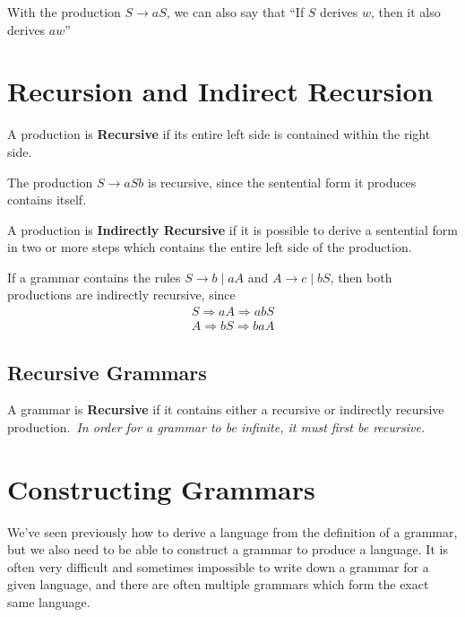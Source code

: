 With the production $S \rightarrow aS$, we can also say that ``If $S$ derives $w$, then it also derives $aw$''

\section*{Recursion and Indirect Recursion}

\begin{definition*}{}{}
  A production is \textbf{Recursive} if its entire left side is contained within the right side.
\end{definition*}
\begin{example*}{}{}
  The production $S \rightarrow aSb$ is recursive, since the sentential form it produces contains itself.
\end{example*}

\begin{definition*}{}{}
  A production is \textbf{Indirectly Recursive} if it is possible to derive a sentential form in two or more steps which
   contains the entire left side of the production.
\end{definition*}
\begin{example*}{}{}
  If a grammar contains the rules $S \rightarrow b \mid aA$ and $A \rightarrow c \mid bS$, then both productions are
   indirectly recursive, since
  \begin{gather*}
    S \Rightarrow aA \Rightarrow abS\\
    A \Rightarrow bS \Rightarrow baA
  \end{gather*}
\end{example*}

\subsection*{Recursive Grammars}

\begin{definition*}{}{}
  A grammar is \textbf{Recursive} if it contains either a recursive or indirectly recursive production.\ \textit{In order
   for a grammar to be infinite, it must first be recursive.}
\end{definition*}

\section*{Constructing Grammars}

We've seen previously how to derive a language from the definition of a grammar, but we also need to be able to construct
 a grammar to produce a language. It is often very difficult and sometimes impossible to write down a grammar for a
 given language, and there are often multiple grammars which form the exact same language.

